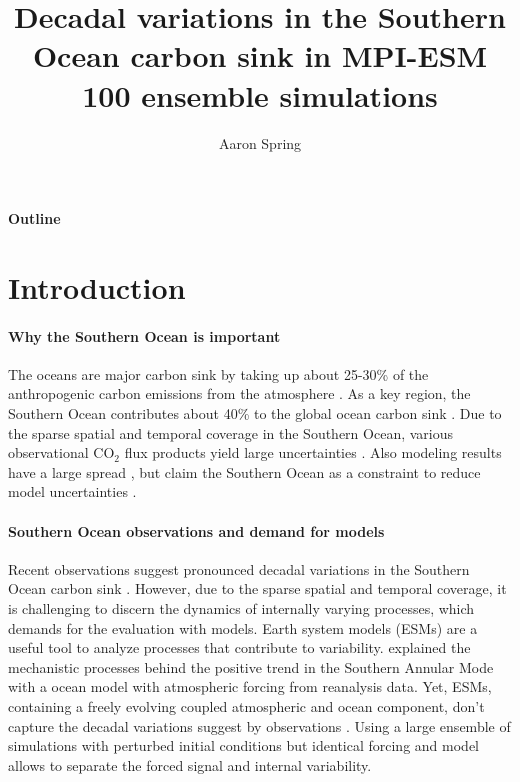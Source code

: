 \documentclass[12pt]{article}
\author{Aaron Spring}
\begin{document}
 


\baselineskip24pt

\title{Decadal variations in the Southern Ocean carbon sink in MPI-ESM 100 ensemble simulations} %
\maketitle 
\vspace{5cm}
\begin{center}
\Huge
\textbf{Outline}
\end{center}

\normalsize
\newpage
\tableofcontents

\newpage

\section{Introduction}

\paragraph{Why the Southern Ocean is important} 
The oceans are major carbon sink by taking up about 25-30\% of the anthropogenic carbon emissions from the atmosphere \citep{Quere2016}. As a key region, the Southern Ocean contributes about 40\% to the global ocean carbon sink \citep{Sabine2004}. Due to the sparse spatial and temporal coverage in the Southern Ocean, various observational CO$_2$ flux products yield large uncertainties \citep{Roedenbeck2015}. Also modeling results have a large spread \citep{Wang2016}, but claim the Southern Ocean as a constraint to reduce model uncertainties \citep{Kessler2016}.

\paragraph{Southern Ocean observations and demand for models}
Recent observations suggest pronounced decadal variations in the Southern Ocean carbon sink \citep{Roedenbeck2013,landschuetzer2015}. However, due to the sparse spatial and temporal coverage, it is challenging to discern the dynamics of internally varying processes, which demands for the evaluation with models. Earth system models (ESMs) are a useful tool to analyze processes that contribute to variability. \cite{Lovenduski2007,Lovenduski2008} explained the mechanistic processes behind the positive trend in the Southern Annular Mode with a ocean model with atmospheric forcing from reanalysis data. Yet, ESMs, containing a freely evolving coupled atmospheric and ocean component, don't capture the decadal variations suggest by observations \citep{Wang2016}. Using a large ensemble of simulations with perturbed initial conditions but identical forcing and model allows to separate the forced signal and internal variability.
\end{document}
